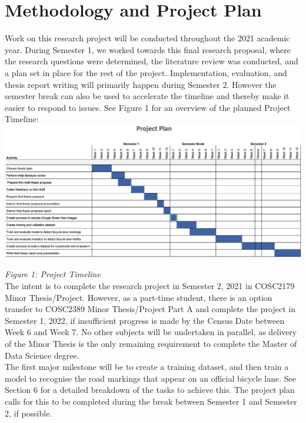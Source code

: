 \documentclass{article}
\begin{document}
\cleardoublepage


\section{Methodology and Project Plan}

Work on this research project will be conducted throughout the 2021 academic year.  During Semester 1, we worked towards this final research proposal, where the research questions were determined, the literature review was conducted, and a plan set in place for the rest of the project.  Implementation, evaluation, and thesis report writing will primarily happen during Semester 2.  However the semester break can also be used to accelerate the timeline and thereby make it easier to respond to issues.  See Figure 1 for an overview of the planned Project Timeline:
\\
\includegraphics[width=\textwidth]{ProjectPlan005.png}

\textit{Figure 1: Project Timeline}
\\

The intent is to complete the research project in Semester 2, 2021 in COSC2179 Minor Thesis/Project.  However, as a part-time student, there is an option transfer to COSC2389 Minor Thesis/Project Part A and complete the project in Semester 1, 2022, if insufficient progress is made by the Census Date between Week 6 and Week 7.  No other subjects will be undertaken in parallel, as delivery of the Minor Thesis is the only remaining requirement to complete the Master of Data Science degree.\\

The first major milestone will be to create a training dataset, and then train a model to recognise the road markings that appear on an official bicycle lane.  See Section 6 for a detailed breakdown of the tasks to achieve this.  The project plan calls for this to be completed during the break between Semester 1 and Semester 2, if possible. \\
\end{document}
